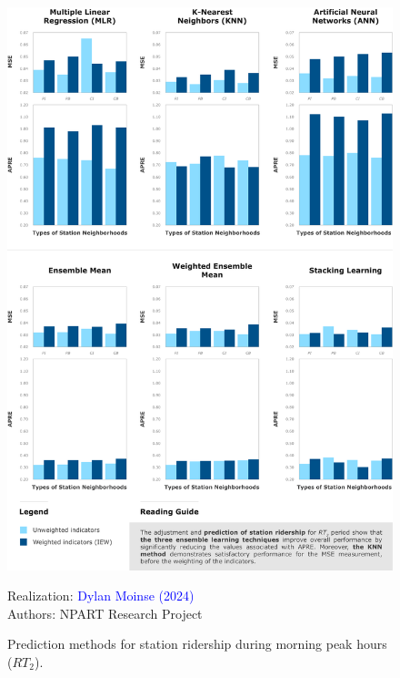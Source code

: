 \begin{refsegment}
\begin{figure}[h!]\vspace*{4pt}
    \caption{Prediction methods for station ridership during morning peak hours (\(RT_{2}\)).}
    \label{fig-chap6:prediction-frequentation}
    \centerline{\includegraphics[width=1\columnwidth]{src/Figures/Chap-6/EN_NPART_Prediction_frequentation.pdf}}
    \vspace{5pt}
    \begin{flushright}\scriptsize{
    Realization: \textcolor{blue}{Dylan Moinse (2024)}
    \\
    Authors: \acrshort{NPART} Research Project
    }\end{flushright}
\end{figure}


\end{refsegment}
